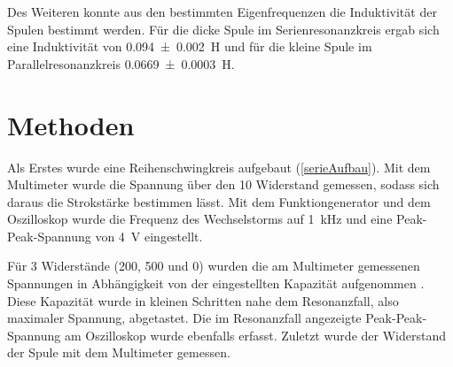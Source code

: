 \documentclass[
	a4paper,
	12pt,
	pagesize,
	ngerman
]{scrartcl}
\begin{document}
	Des Weiteren konnte aus den bestimmten Eigenfrequenzen die Induktivität der Spulen bestimmt werden.
	Für die dicke Spule im Serienresonanzkreis ergab sich eine Induktivität von \SI{0,094 \pm 0,002}{H} und für die kleine Spule im Parallelresonanzkreis \SI{0,0669 \pm 0,0003}{H}.


	\section{Methoden}
	Als Erstes wurde eine Reihenschwingkreis aufgebaut (\cref{serieAufbau}).
	Mit dem Multimeter wurde die Spannung über den \SI{10}{\Omega} Widerstand gemessen, sodass sich daraus die Strokstärke bestimmen lässt.
	Mit dem Funktiongenerator und dem Oszilloskop wurde die Frequenz des Wechselstorms auf \SI{1}{kHz} und eine Peak-Peak-Spannung von \SI{4}{V} eingestellt.

	Für 3 Widerstände (\SI{200}{\Omega}, \SI{500}{\Omega} und \SI{0}{\Omega}) wurden die am Multimeter gemessenen Spannungen in Abhängigkeit von der eingestellten Kapazität aufgenommen .
	Diese Kapazität wurde in kleinen Schritten nahe dem Resonanzfall, also maximaler Spannung, abgetastet.
	Die im Resonanzfall angezeigte Peak-Peak-Spannung am Oszilloskop wurde ebenfalls erfasst.
	Zuletzt wurde der Widerstand der Spule mit dem Multimeter gemessen.
\end{document}
